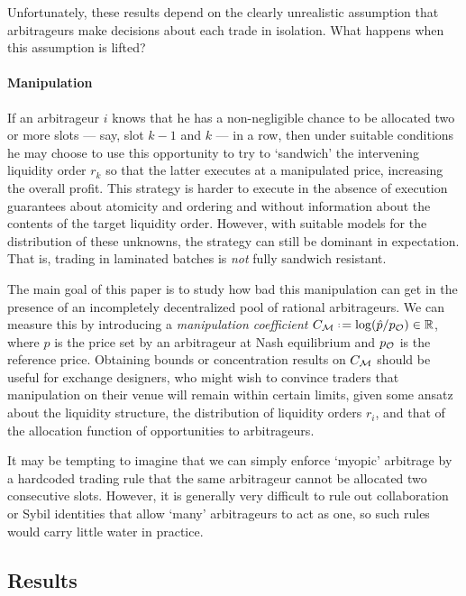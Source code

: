 Unfortunately, these results depend on the clearly unrealistic assumption that arbitrageurs make decisions about each trade in isolation.
%
What happens when this assumption is lifted?


\paragraph{Manipulation}
If an arbitrageur $i$ knows that he has a non-negligible chance to be allocated two or more slots --- say, slot $k-1$ and $k$ --- in a row, then under suitable conditions he may choose to use this opportunity to try to `sandwich' the intervening liquidity order $r_k$ so that the latter executes at a manipulated price, increasing the overall profit.
%
This strategy is harder to execute in the absence of execution guarantees about atomicity and ordering and without information about the contents of the target liquidity order.
%
However, with suitable models for the distribution of these unknowns, the strategy can still be dominant in expectation.
%
That is, trading in laminated batches is \emph{not} fully sandwich resistant.


The main goal of this paper is to study how bad this manipulation can get in the presence of an incompletely decentralized pool of rational arbitrageurs.
%
We can measure this by introducing a \emph{manipulation coefficient} $C_\market\defeq \log(\hat p/p_\oracle)\in\mathbb{R}$, where $\hat p$ is the price set by an arbitrageur at Nash equilibrium and $p_{\mathcal{O}}$ is the reference price.
%
Obtaining bounds or concentration results on $C_{\mathcal{M}}$ should be useful for exchange designers, who might wish to convince traders that manipulation on their venue will remain within certain limits, given some ansatz about the liquidity structure, the distribution of liquidity orders $r_i$, and that of the allocation function of opportunities to arbitrageurs.

\begin{remark}

  It may be tempting to imagine that we can simply enforce `myopic' arbitrage by a hardcoded trading rule that the same arbitrageur cannot be allocated two consecutive slots.
  However, it is generally very difficult to rule out collaboration or Sybil identities that allow `many' arbitrageurs to act as one, so such rules would carry little water in practice.

\end{remark}

\subsection{Results}

